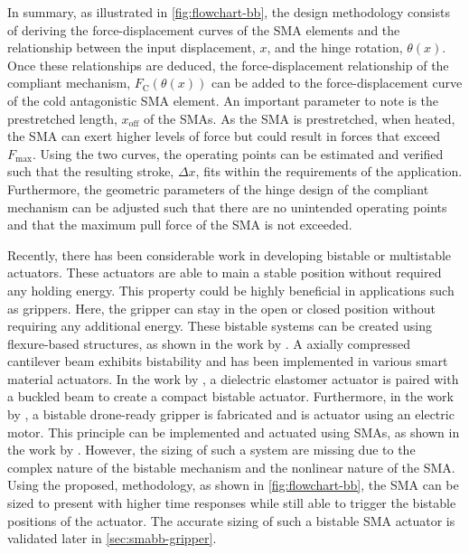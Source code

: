 In summary, as illustrated in \cref{fig:flowchart-bb}, the design methodology consists of deriving the force-displacement curves of the SMA elements and the relationship between the input displacement, $x$, and the hinge rotation, $\theta(x)$. Once these relationships are deduced, the force-displacement relationship of the compliant mechanism, $F_\mathrm{C}(\theta(x))$ can be added to the force-displacement curve of the cold antagonistic SMA element. An important parameter to note is the prestretched length, $x_\mathrm{off}$ of the SMAs. As the SMA is prestretched, when heated, the SMA can exert higher levels of force but could result in forces that exceed $F_\mathrm{max}$. Using the two curves, the operating points can be estimated and verified such that the resulting stroke, $\Delta x$, fits within the requirements of the application. Furthermore, the geometric parameters of the hinge design of the compliant mechanism can be adjusted such that there are no unintended operating points and that the maximum pull force of the SMA is not exceeded.


Recently, there has been considerable work in developing bistable or multistable actuators. These actuators are able to main a stable position without required any holding energy. This property could be highly beneficial in applications such as grippers. Here, the gripper can stay in the open or closed position without requiring any additional energy. These bistable systems can be created using flexure-based structures, as shown in the work by \cite{jinqiuCurvedbeamBistableMechanism2004}. A axially compressed cantilever beam exhibits bistability and has been implemented in various smart material actuators. In the work by \cite{chouinardBistableAntagonisticDielectric2012}, a dielectric elastomer actuator is paired with a buckled beam to create a compact bistable actuator. Furthermore, in the work by \cite{zhangCompliantBistableGrippers2020}, a bistable drone-ready gripper is fabricated and is actuator using an electric motor. This principle can be implemented and actuated using SMAs, as shown in the work by \cite{welschVacuumGripperSystem2018a}. However, the sizing of such a system are missing due to the complex nature of the bistable mechanism and the nonlinear nature of the SMA. Using the proposed, methodology, as shown in \cref{fig:flowchart-bb}, the SMA can be sized to present with higher time responses while still able to trigger the bistable positions of the actuator. The accurate sizing of such a bistable SMA actuator is validated later in \cref{sec:smabb-gripper}.

